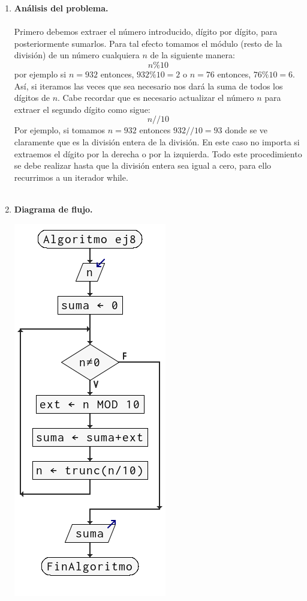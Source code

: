 \begin{enumerate}
\begin{enumerate}[\bfseries a)]
    \item \textbf{Análisis del problema.}\\\\
	Primero debemos extraer el número introducido, dígito por dígito, para posteriormente sumarlos. Para tal efecto tomamos el módulo (resto de la división) de un número cualquiera $n$ de la siguiente manera:
	$$n \% 10$$ por ejemplo si $n=932$ entonces, $932\%10 = 2$ o $n=76$ entonces, $76\%10 = 6$. Así, si iteramos las veces que sea necesario nos dará la suma de todos los dígitos de $n$. Cabe recordar que es necesario actualizar el número $n$ para extraer el segundo dígito como sigue:
	$$n//10$$
	Por ejemplo, si tomamos $n=932$ entonces $932//10=93$ donde se ve claramente que es la división entera de la división.
	En este caso no importa si extraemos el dígito por la derecha o por la izquierda. Todo este procedimiento se debe realizar hasta que la división entera sea igual a cero, para ello recurrimos a un iterador while.\\\\

    \item \textbf{Diagrama de flujo.}\\
	\begin{center}
	    \includegraphics[scale=.65]{imagenes/tarea2/ej8pf.png}
	\end{center}
	\vspace{1cm}


\end{enumerate}
\end{enumerate}
